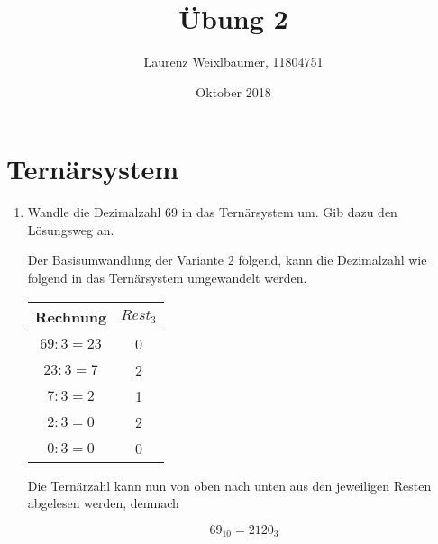 \documentclass{article}
\title{Übung 2}
\author{Laurenz Weixlbaumer, 11804751}
\date{Oktober 2018}
\begin{document}
\maketitle

\section{Ternärsystem}

\begin{enumerate}
    \item Wandle die Dezimalzahl 69 in das Ternärsystem um. Gib dazu den Lösungsweg an.
    
    Der Basisumwandlung der Variante 2 folgend, kann die Dezimalzahl wie folgend in das Ternärsystem umgewandelt werden.
    
    \begin{center}
    \begin{tabular}{c | c}
        Rechnung & $Rest_3$\\
        \hline
        $69 : 3 = 23$ & 0\\
        $23 : 3 = 7$ & 2\\
        $7 : 3 = 2$ & 1\\
        $2 : 3 = 0$ & 2\\
        $0 : 3 = 0$ & 0\\
    \end{tabular}
    \end{center}
    
    Die Ternärzahl kann nun von oben nach unten aus den jeweiligen Resten abgelesen werden, demnach
    
    $$
    69_{10} = 2120_3
    $$
\end{enumerate}
\end{document}
